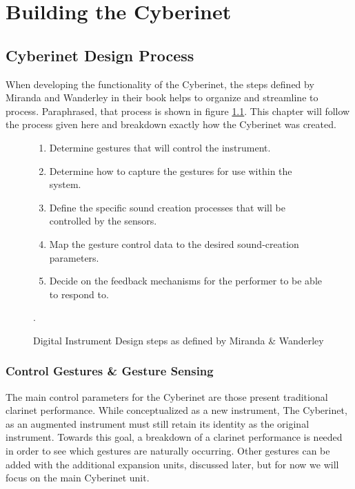 \chapter{Building the Cyberinet}




\section{Cyberinet Design Process}


When developing the functionality of the Cyberinet, the steps defined by Miranda and Wanderley in their book\cite{miranda_Wanderley_instrumentControl_2006} helps to organize and streamline to process. Paraphrased, that process is shown in figure \ref{fig:DMIProcess}. This chapter will follow the process given here and breakdown exactly how the Cyberinet was created.

\begin{figure}
    \centering
    \begin{enumerate}
    \item Determine gestures that will control the instrument.
    \item Determine how to capture the gestures for use within the system.
    \item Define the specific sound creation processes that will be controlled by the sensors.
    \item Map the gesture control data to the desired sound-creation parameters.
    \item Decide on the feedback mechanisms for the performer to be able to respond to.
\end{enumerate}
    \caption{Digital Instrument Design steps as defined by Miranda \& Wanderley\cite{miranda_Wanderley_instrumentControl_2006}}.
    \label{fig:DMIProcess}
\end{figure}

\subsection{Control Gestures \& Gesture Sensing}
The main control parameters for the Cyberinet are those present traditional clarinet performance. While conceptualized as a new instrument, The Cyberinet, as an augmented instrument must still retain its identity as the original instrument\cite{miranda_Wanderley_instrumentControl_2006}. Towards this goal, a breakdown of a clarinet performance is needed in order to see which gestures are naturally occurring. Other gestures can be added with the additional expansion units, discussed later, but for now we will focus on the main Cyberinet unit.

